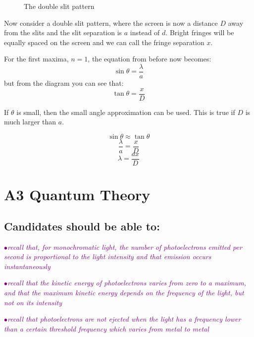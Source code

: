 \documentclass[a4paper,11pt,twoside]{memoir}
\newcounter{spec}[chapter]
\newcommand{\spec}[1]{\Needspace{5\baselineskip}\textcolor{purple}{$\bullet$\hspace{0.5cm}\textit{#1}}}
\begin{document}
\newpage

\begin{figure}[h]
    \centering
    \caption{The double slit pattern}
    \label{doubleslitscreen}
\end{figure}

Now consider a double slit pattern, where the screen is now a distance $D$ away from the slits and the slit separation is $a$ instead of $d$. Bright fringes will be equally spaced on the screen and we can call the fringe separation $x$.



For the first maxima, $n=1$, the equation from before now becomes:
$$\sin\theta = \frac{\lambda}{a}$$
but from the diagram you can see that:
$$\tan\theta = \frac{x}{D}$$

If $\theta$ is small, then the small angle approximation can be used. This is true if $D$ is much larger than $a$.

$$\sin\theta \approx \tan\theta$$
$$\frac{\lambda}{a} = \frac{x}{D}$$
$$\lambda = \frac{ax}{D}$$

\chapter{A3 Quantum Theory}
\setcounter{spec}{0}
\section*{Candidates should be able to:}

\spec{recall that, for monochromatic light, the number of photoelectrons emitted per second is proportional to the light intensity and that emission occurs instantaneously}

\spec{recall that the kinetic energy of photoelectrons varies from zero to a maximum, and that the maximum kinetic energy depends on the frequency of the light, but not on its intensity}

\spec{recall that photoelectrons are not ejected when the light has a frequency lower than a certain threshold frequency which varies from metal to metal}
\end{document}
